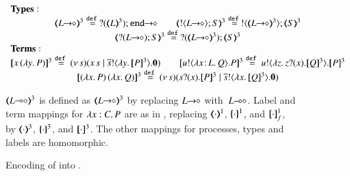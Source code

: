 \begin{figure}[t]
$
{%
\begin{array}{c}
	\multicolumn{1}{l}{\noindent{\bf Types:}}
	\\
	\tmap{\shot{L}}{3} \defeq \shot{\btinp{\tmap{L}{3}} \tinact}
	\qquad
	\tmap{\btout{\shot{L}} S}{3} \defeq \btout{\tmap{\shot{L}}{3}} \tmap{S}{3}
	\\
	\tmap{\btinp{\shot{L}} S}{3} \defeq \btinp{\tmap{\shot{L}}{3}} \tmap{S}{3}
	\\
	\multicolumn{1}{l}{\noindent{\bf Terms:}}
	\\
	\pmap{\appl{x}{(\abs{y} P)}}{3} \defeq \newsp{s}{\appl{x}{s} \Par \bout{\dual{s}}{\abs{y} \pmap{P}{3}} \inact}
	\qquad
	\pmap{\bout{u}{\abs{\AT{x}{L}}{Q}} P}{3} \defeq \bout{u}{\abs{z}{\binp{z}{x} \pmap{Q}{3}}} \pmap{P}{3}
	\\
	\pmap{\appl{(\abs{x}{P})}{(\abs{x}Q})}{3} \defeq \newsp{s}{\binp{s}{x} \pmap{P}{3} \Par  \bout{\dual{s}}{\abs{x} \pmap{Q}{3}} \inact}
\end{array}
}
$

$\tmap{\lhot{L}}{3}$ is defined as $\tmap{\shot{L}}{3}$
by replacing $L\!\! \rightarrow\!\! \diamond$ with~$L\!\! \multimap\!\! \diamond$.
Label and term mappings for $\lambda x:C.\,P$ are
as in , replacing 
$(\!\!\langle\cdot\rangle\!\!)^{1}$,
$\{\!\!\{\cdot\}\!\!\}^{1}$, and 
$[\!\![\cdot]\!\!]^1_f$, by  
$(\!\!\langle\cdot\rangle\!\!)^{3}$,
$\{\!\!\{\cdot\}\!\!\}^{3}$, and 
$[\!\![\cdot]\!\!]^3$.
The other mappings for processes, types and labels are  homomorphic.

\caption{\label{f:enc:hopip_to_hopi} Encoding of \HOpp into \HOp.}
\end{figure} 
